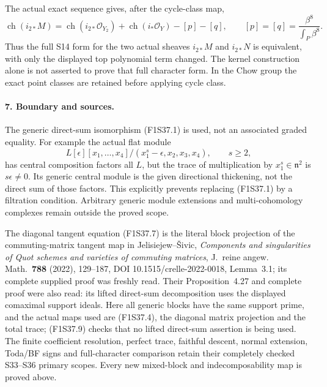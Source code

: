 The actual exact sequence gives,
after the cycle-class map,
\[
 \operatorname{ch}(i_{2*}M)
  =\operatorname{ch}(i_{2*}\mathcal O_{Y_2})
      +\operatorname{ch}(i_*\mathcal O_Y)-[p]-[q],
 \qquad [p]=[q]=\frac{\beta^8}{\int_P\beta^8}.
 \tag{F1S37.23}
\]
Thus the full S14 form for the two
actual sheaves $i_{2*}M$ and $i_{2*}N$
is equivalent, with only the displayed
top polynomial term changed. The
kernel construction alone is not
asserted to prove that full character
form. In the Chow group the exact
point classes are retained before
applying cycle class.

\paragraph{7. Boundary and sources.}
The generic direct-sum isomorphism
(F1S37.1) is used, not an associated
graded equality. For example the
actual flat module
\[
 L[\epsilon][x_1,\ldots,x_4]/
                  (x_1^s-\epsilon,x_2,x_3,x_4),\qquad s\ge2,
 \tag{F1S37.24}
\]
has central composition factors all
$L$, but the trace of multiplication
by $x_1^s\in\mathfrak n^2$ is
$s\epsilon\ne0$. Its generic central
module is the given directional
thickening, not the direct sum of
those factors. This explicitly
prevents replacing (F1S37.1) by a
filtration condition. Arbitrary
generic module extensions and
multi-cohomology complexes remain
outside the proved scope.

The diagonal tangent equation
(F1S37.7) is the literal block
projection of the commuting-matrix
tangent map in Jelisiejew--\v Sivic,
\emph{Components and singularities
of Quot schemes and varieties of
commuting matrices}, J.~reine angew.
Math.~\textbf{788} (2022), 129--187,
DOI 10.1515/crelle-2022-0018,
Lemma~3.1; its complete supplied
proof was freshly read. Their
Proposition~4.27 and complete proof
were also read: its lifted direct-sum
decomposition uses the displayed
comaximal support ideals. Here all
generic blocks have the same support
prime, and the actual maps used are
(F1S37.4), the diagonal matrix
projection and the total trace;
(F1S37.9) checks that no lifted
direct-sum assertion is being used.
The finite coefficient resolution,
perfect trace, faithful descent,
normal extension, Toda/BF signs
and full-character comparison
retain their completely checked
S33--S36 primary scopes. Every
new mixed-block and indecomposability
map is proved above.
